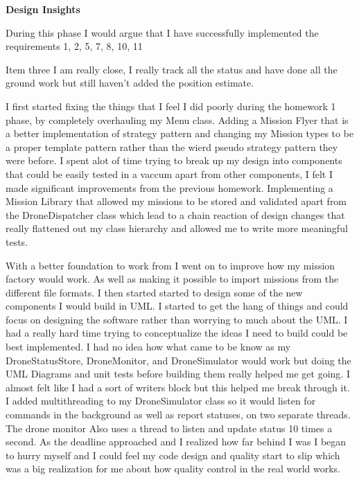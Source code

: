 \documentclass[12pt]{article}
\begin{document}
\begingroup
      \fontsize{14pt}{12pt}\selectfont

      \centerline{\textbf{Design Insights}} \par
\endgroup

During this phase I would argue that I have successfully implemented the requirements 1, 2, 5, 7, 8, 10, 11

Item three I am really close, I really track all the status and have done all the ground work but still haven't added the position estimate.

I first started fixing the things that I feel I did poorly during the homework 1 phase, by completely overhauling my Menu class. Adding a Mission Flyer that is a better implementation of strategy pattern 
and changing my Mission types to be a proper template pattern rather than the wierd pseudo strategy pattern they were before.
I spent alot of time trying to break up my design into components that could be easily tested in a vaccum apart from other components, I felt I made significant improvements from the previous homework.
Implementing a Mission Library that allowed my missions to be stored and validated apart from the DroneDispatcher class which lead to a chain reaction of design changes 
that really flattened out my class hierarchy and allowed me to write more meaningful tests.

With a better foundation to work from I went on to improve how my mission factory would work. As well as making it possible to import missions from the different file formats.
I then started started to design some of the new components I would build in UML. I started to get the hang of things and could focus on designing the software rather than worrying to much about the UML.
I had a really hard time trying to conceptualize the ideas I need to build could be best implemented. I had no idea how what came to be know as my DroneStatusStore, DroneMonitor, and DroneSimulator would work
but doing the UML Diagrams and unit tests before building them really helped me get going. I almost felt like I had a sort of writers block but this helped me break through it.
I added multithreading to my DroneSimulator class so it would listen for commands in the background as well as report statuses, on two separate threads. The drone monitor Also uses a thread to listen and update status 10 times a second.
As the deadline approached and I realized how far behind I was I began to hurry myself and I could feel my code design and quality start to slip which was a big realization for me about how quality control in the real world works.
\end{document}
